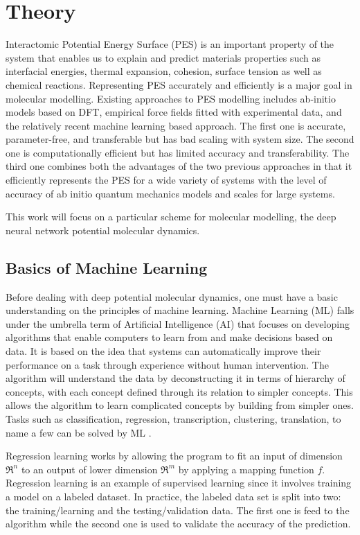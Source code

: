 \chapter{Theory}

Interactomic Potential Energy Surface (PES) is an important property of the
system
that enables us to explain and predict materials properties such as interfacial
energies, thermal expansion, cohesion, surface tension as well as chemical
reactions.
Representing PES accurately and efficiently is a major goal in molecular
modelling.
Existing approaches to PES modelling includes ab-initio models based on DFT,
empirical force fields fitted with experimental data, and the
relatively recent
machine learning based approach. The first one is accurate, parameter-free, and
transferable but has bad scaling with system size. The second one is
computationally efficient but has limited accuracy and transferability.
The third one combines both the advantages of the two previous approaches in
that it efficiently represents the PES for a
wide variety of systems with the level of accuracy of ab initio quantum
mechanics
models and scales for large systems.

This work will focus on a particular scheme for molecular modelling, the deep
neural network
potential molecular dynamics.

\section{Basics of Machine Learning}
Before dealing with deep potential molecular dynamics, one must have a basic
understanding on the principles of machine learning. Machine Learning (ML)
falls
under
the umbrella
term of Artificial Intelligence
(AI)
that focuses on developing algorithms that enable computers to learn from and
make decisions based on data. It is based on the idea that systems can
automatically improve their performance on a task through experience without
human intervention. The algorithm will understand the data by deconstructing it
in terms of hierarchy of concepts, with each concept defined through its
relation to simpler concepts. This allows the algorithm to learn complicated
concepts by building from simpler ones. Tasks such as classification,
regression, transcription, clustering, translation, to name a few can be solved
by ML \cite{Goodfellow2016}.


Regression learning works by allowing the program to fit an input of dimension
$\mathfrak{R}^n$ to an output of lower dimension $\mathfrak{R}^m$ by applying a
mapping function $f$.
Regression learning is an example of supervised learning since it
involves training a model on a labeled dataset. In practice, the labeled data
set is split into two: the training/learning and the testing/validation
data. The first one is feed to the algorithm while the second one is used to
validate the accuracy of the prediction.

